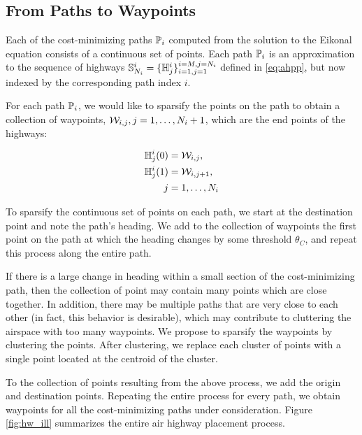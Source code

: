 \subsection{From Paths to Waypoints}
Each of the cost-minimizing paths $\mathbb{P}_i$ computed from the solution to the Eikonal equation consists of a continuous set of points. Each path $\mathbb{P}_i$ is an approximation to the sequence of highways $\mathbb{S}_{N_i}^i = \{\mathbb{H}^i_j\}_{i=1,j=1}^{i=M,j=N_i}$ defined in \eqref{eq:ahpp}, but now indexed by the corresponding path index $i$. 

For each path $\mathbb{P}_i$, we would like to sparsify the points on the path to obtain a collection of waypoints, $\mathcal{W}_{i,j}, j = 1,\ldots, N_i+1$, which are the end points of the highways:

\begin{equation}
\begin{aligned}
\mathbb{H}^i_j(0) &= \mathcal{W}_{i,j}, \\
\mathbb{H}^i_j(1) &= \mathcal{W}_{i,j+1}, \\
j &= 1,\ldots,N_i
\end{aligned}
\end{equation}

To sparsify the continuous set of points on each path, we start at the destination point and note the path's heading. We add to the collection of waypoints the first point on the path at which the heading changes by some threshold $\theta_C$, and repeat this process along the entire path.

If there is a large change in heading within a small section of the cost-minimizing path, then the collection of point may contain many points which are close together. In addition, there may be multiple paths that are very close to each other (in fact, this behavior is desirable), which may contribute to cluttering the airspace with too many waypoints. We propose to sparsify the waypoints by clustering the points. After clustering, we replace each cluster of points with a single point located at the centroid of the cluster. 

To the collection of points resulting from the above process, we add the origin and destination points. Repeating the entire process for every path, we obtain waypoints for all the cost-minimizing paths under consideration. Figure \ref{fig:hw_ill} summarizes the entire air highway placement process.